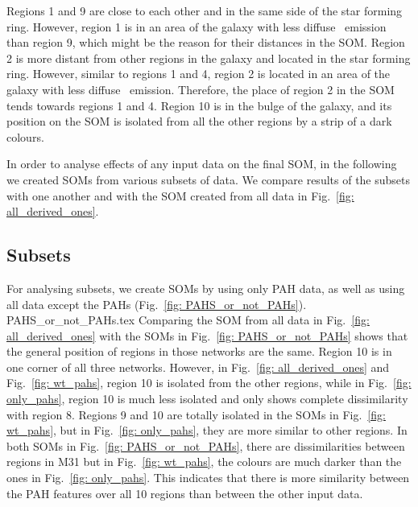     Regions 1 and 9 are close to each other and in the same side of the star forming ring. 
    However, region 1 is in an area of the galaxy with less diffuse \halpha~emission than region 9, which might be the reason for their distances in the SOM.
    Region 2 is more distant from other regions in the galaxy and located in the star forming ring.
    However, similar to regions 1 and 4, region 2 is located in an area of the galaxy with less diffuse \halpha~emission.
    Therefore, the place of region 2 in the SOM tends towards regions 1 and 4. 
    Region 10 is in the bulge of the galaxy, and its position on the SOM is isolated from all the other regions by a strip of a dark colours. 
    
    In order to analyse effects of any input data on the final SOM, in the following we created SOMs from various subsets of data.
    We compare results of the subsets with one another and with the SOM created from all data in Fig.~\ref{fig: all_derived_ones}.

    \subsection{Subsets}
    \label{sec: subsets}
    
            For analysing subsets, we create SOMs by using only PAH data, as well as using all data except the PAHs (Fig.~\ref{fig: PAHS_or_not_PAHs}).
             {PAHS_or_not_PAHs.tex}
            Comparing the SOM from all data in Fig.~\ref{fig: all_derived_ones} with the SOMs in Fig.~\ref{fig: PAHS_or_not_PAHs} shows that the general position of regions in those networks are the same. 
            Region 10 is in one corner of all three networks.
            However, in Fig.~\ref{fig: all_derived_ones} and Fig.~\ref{fig: wt_pahs}, region 10 is isolated from the other regions, while in Fig.~\ref{fig: only_pahs}, region 10 is much less isolated and only shows complete dissimilarity with region 8.
            Regions 9 and 10 are totally isolated in the SOMs in Fig.~\ref{fig: wt_pahs}, but in Fig.~\ref{fig: only_pahs}, they are more similar to other regions.
            In both SOMs in Fig.~\ref{fig: PAHS_or_not_PAHs}, there are dissimilarities between regions in M31 but in Fig.~\ref{fig: wt_pahs}, the colours are much darker than the ones in Fig.~\ref{fig: only_pahs}.
            This indicates that there is more similarity between the PAH features over all 10 regions than between the other input data.
            
